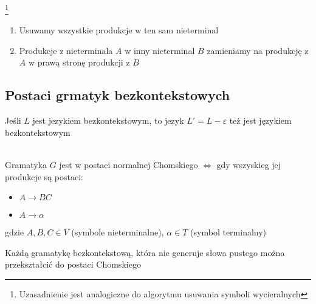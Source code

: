 	\begin{alg}\footnote{Uzasadnienie jest analogiczne do algorytmu usuwania symboli wycieralnych}~\\
		\begin{enumerate}
			\item Usuwamy wszystkie produkcje w ten sam nieterminal
			\item Produkcje z nieterminala $A$ w inny nieterminal $B$ zamieniamy na produkcję z $A$ w prawą stronę produkcji z $B$
		\end{enumerate}
	\end{alg}
	
\subsection{Postaci grmatyk bezkontekstowych}

	\begin{tw}
		Jeśli $L$ jest jezykiem bezkontekstowym, to jezyk $L' = L - \varepsilon$ też jest językiem bezkontekstowym
	\end{tw}
	
	\begin{df}~\\
		Gramatyka $G$ jest w postaci normalnej Chomskiego $\Leftrightarrow$ gdy wszyskieg jej produkcje są postaci:
		\begin{itemize}
			\item $A\rightarrow BC$
			\item $A \rightarrow \alpha$
		\end{itemize}
		gdzie $A,B,C \in V$ (symbole nieterminalne), $\alpha \in T$ (symbol terminalny)
	\end{df}
	
	\begin{lemat}
		Każdą gramatykę bezkontekstową, która nie generuje słowa pustego można przekształcić do postaci Chomskiego
	\end{lemat}
	
